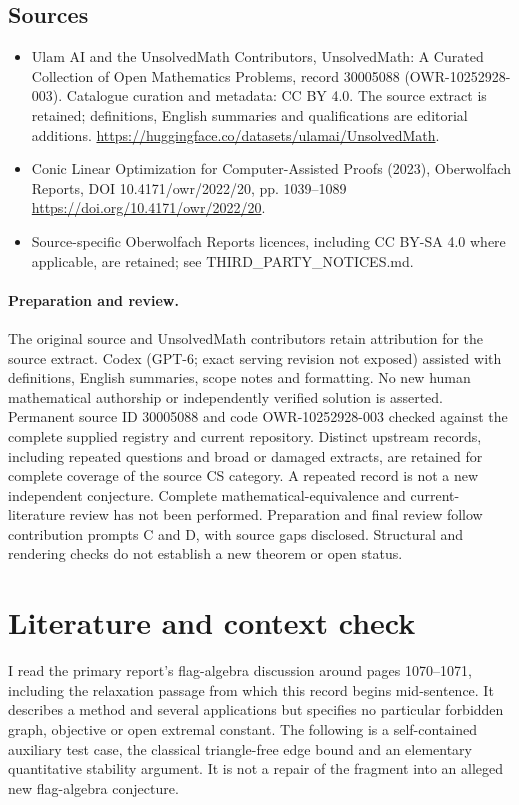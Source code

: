 \documentclass[11pt]{article}
\begin{document}
\subsection{Sources}
\begin{itemize}
\item[S1] Ulam AI and the UnsolvedMath Contributors, UnsolvedMath: A Curated Collection of Open Mathematics Problems, record 30005088 (OWR-10252928-003). Catalogue curation and metadata: CC BY 4.0. The source extract is retained; definitions, English summaries and qualifications are editorial additions.
\url{https://huggingface.co/datasets/ulamai/UnsolvedMath}.
\item[S2] Conic Linear Optimization for Computer-Assisted Proofs (2023), Oberwolfach Reports, DOI 10.4171/owr/2022/20, pp. 1039--1089
\url{https://doi.org/10.4171/owr/2022/20}.
\item Source-specific Oberwolfach Reports licences, including CC BY-SA 4.0 where applicable, are retained; see THIRD\_PARTY\_NOTICES.md.
\end{itemize}
\paragraph{Preparation and review.}
The original source and UnsolvedMath contributors retain attribution for the source extract. Codex (GPT-6; exact serving revision not exposed) assisted with definitions, English summaries, scope notes and formatting. No new human mathematical authorship or independently verified solution is asserted. Permanent source ID 30005088 and code OWR-10252928-003 checked against the complete supplied registry and current repository. Distinct upstream records, including repeated questions and broad or damaged extracts, are retained for complete coverage of the source CS category. A repeated record is not a new independent conjecture. Complete mathematical-equivalence and current-literature review has not been performed. Preparation and final review follow contribution prompts C and D, with source gaps disclosed. Structural and rendering checks do not establish a new theorem or open status.
\label{end:30005088}

\section{Literature and context check}

I read the primary report's flag-algebra discussion around pages 1070--1071,
including the relaxation passage from which this record begins mid-sentence.
It describes a method and several applications but specifies no particular
forbidden graph, objective or open extremal constant. The following is a
self-contained auxiliary test case, the classical triangle-free edge bound and
an elementary quantitative stability argument. It is not a repair of the
fragment into an alleged new flag-algebra conjecture.
\end{document}
